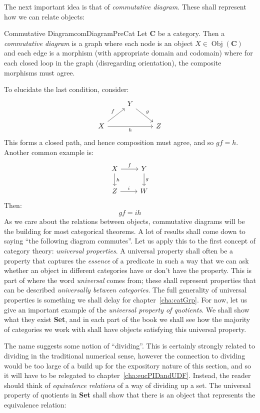 \documentclass{book}
\newcommand{\Obj}{{\operatorname{Obj}}}
\renewcommand{\bf}[1]{\textbf{#1}}
\begin{document}
The next important idea is that of \emph{commutative diagram}. These shall represent how we can relate
objects:

\begin{defn}{Commutative Diagram}{comDiagramPreCat}
	Let \textbf{C} be a category. Then a \emph{commutative diagram} is a graph where each node is an object $X
	\in \Obj(\bf{C})$ and each edge is a morphism (with appropriate domain and codomain) where for each closed
	loop in the graph (disregarding orientation), the composite morphisms must agree.
\end{defn}

To elucidate the last condition, consider:
\[
\begin{tikzcd}
                                   & Y \arrow[rd, "g"] &   \\
X \arrow[rr, "h"'] \arrow[ru, "f"] &                   & Z
\end{tikzcd}
\]
This forms a closed path, and hence composition must agree, and so $gf = h$. Another common example is:
\[
\begin{tikzcd}
X \arrow[r, "f"] \arrow[d, "h"] & Y \arrow[d, "g"] \\
Z \arrow[r, "i"]                & W
\end{tikzcd}
\]
Then:
\[
	gf = ih
\]
As we care about the relations between objects, commutative diagrams will be the building for most categorical
theorems. A lot of results shall come down to saying ``the following diagram commutes''. Let us apply this to
the first concept of category theory: \emph{universal properties}. A universal property shall often be
a property that captures the \emph{essence} of a predicate in such a way that we can ask whether an object in
different categories have or don't have the property. This is part of where the word \emph{universal} comes
from; these shall represent properties that can be described \emph{universally between categories}. The full
generality of universal properties is something we shall delay for chapter~\ref{cha:catGrp}. For now, let us give an
important example of the \emph{universal property of quotients}. We shall show what they exist \textbf{Set}, and
in each part of the book we shall see how the majority of categories we work with shall have objects
satisfying this universal property.

The name suggests some notion of ``dividing''. This is certainly strongly related to dividing in the
traditional numerical sense, however the connection to dividing would be too large of a build up for the
expository nature of this section, and so it will have to be relegated to chapter~\ref{cha:eucPIDandUDF}.
Instead, the reader should think of \emph{equivalence relations} of a way of dividing up a set. The universal
property of quotients in \textbf{Set} shall show that there is an object that represents the equivalence
relation:
\end{document}
